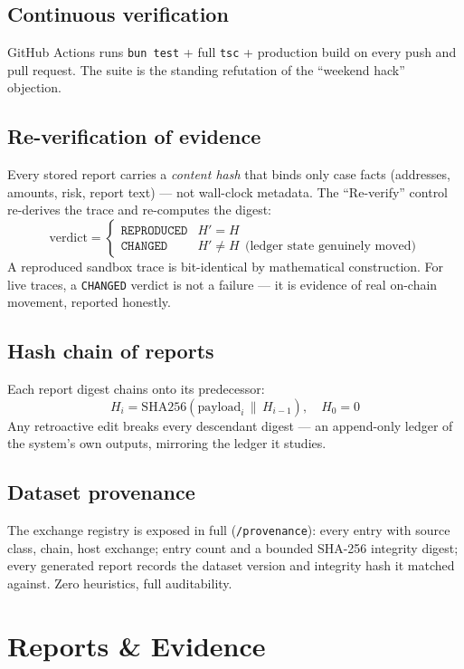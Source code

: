 \documentclass[11pt,a4paper]{article}
\begin{document}
\subsection{Continuous verification}
GitHub Actions runs \texttt{bun test} + full \texttt{tsc} + production build on
every push and pull request. The suite is the standing refutation of the
``weekend hack'' objection.

\subsection{Re-verification of evidence}
Every stored report carries a \emph{content hash} that binds only case facts
(addresses, amounts, risk, report text) --- not wall-clock metadata. The
``Re-verify'' control re-derives the trace and re-computes the digest:
\[
\mathrm{verdict} =
\begin{cases}
\texttt{REPRODUCED} & H' = H \\
\texttt{CHANGED} & H' \neq H \ \ \text{(ledger state genuinely moved)}
\end{cases}
\]
A reproduced sandbox trace is bit-identical by mathematical construction. For
live traces, a \texttt{CHANGED} verdict is not a failure --- it is evidence of
real on-chain movement, reported honestly.

\subsection{Hash chain of reports}
Each report digest chains onto its predecessor:
\[ H_i = \mathrm{SHA256}(\mathrm{payload}_i \,\|\, H_{i-1}), \quad H_0 = 0 \]
Any retroactive edit breaks every descendant digest --- an append-only ledger of
the system's own outputs, mirroring the ledger it studies.

\subsection{Dataset provenance}
The exchange registry is exposed in full (\texttt{/provenance}): every entry with
source class, chain, host exchange; entry count and a bounded SHA-256 integrity
digest; every generated report records the dataset version and integrity hash it
matched against. Zero heuristics, full auditability.

\section{Reports \& Evidence}
\end{document}
